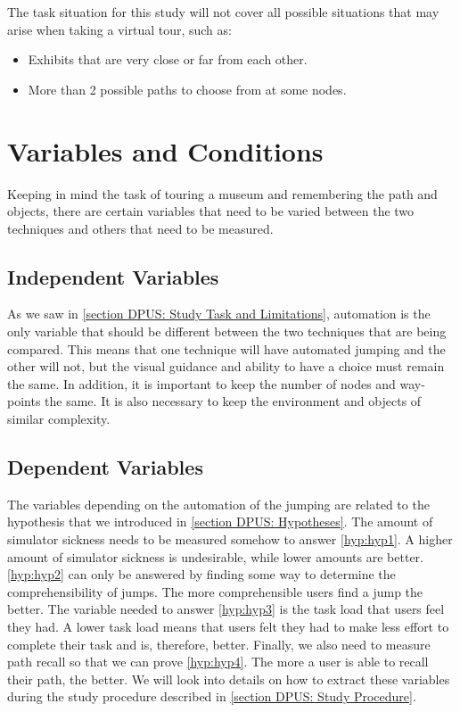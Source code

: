 The task situation for this study will not cover all possible situations that may arise when taking a virtual tour, such as:
\begin{itemize}
	\item Exhibits that are very close or far from each other.
	\item More than 2 possible paths to choose from at some nodes.
\end{itemize} 

\section{Variables and Conditions}
\label{section DPUS: Variables and Conditions}
Keeping in mind the task of touring a museum and remembering the path and objects, there are certain variables that need to be varied between the two techniques and others that need to be measured. 

\subsection{Independent Variables}
\label{subsection DPUS VC: Independent Variables}
As we saw in \cref{section DPUS: Study Task and Limitations}, automation is the only variable that should be different between the two techniques that are being compared. This means that one technique will have automated jumping and the other will not, but the visual guidance and ability to have a choice must remain the same. In addition, it is important to keep the number of nodes and way-points the same. It is also necessary to keep the environment and objects of similar complexity. 

\subsection{Dependent Variables}
\label{subsection DPUS VC: Dependent Variables}
The variables depending on the automation of the jumping are related to the hypothesis that we introduced in \cref{section DPUS: Hypotheses}. The amount of simulator sickness needs to be measured somehow to answer \cref{hyp:hyp1}. A higher amount of simulator sickness is undesirable, while lower amounts are better. \cref{hyp:hyp2} can only be answered by finding some way to determine the comprehensibility of jumps. The more comprehensible users find a jump the better. The variable needed to answer \cref{hyp:hyp3} is the task load that users feel they had. A lower task load means that users felt they had to make less effort to complete their task and is, therefore, better. Finally, we also need to measure path recall so that we can prove \cref{hyp:hyp4}. The more a user is able to recall their path, the better. We will look into details on how to extract these variables during the study procedure described in \cref{section DPUS: Study Procedure}.

